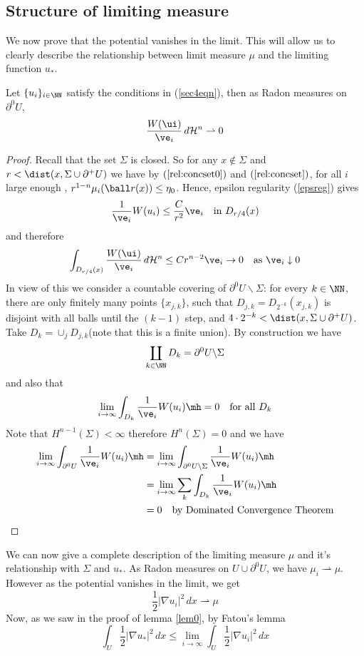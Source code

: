 \subsection{Structure of limiting measure}
We now prove that the potential vanishes in the limit. This will allow us to clearly describe the relationship between limit measure $\mu$ and the limiting function $u_*$.
\begin{prop} \label{vanishing}
Let $\{u_i\}_{i \in \NN}$ satisfy the conditions in (\ref{sec4eqn}), then as Radon measures on $\partial^0 U$,
$$\frac{W(\ui)}{\ve_i}\,d\mathcal{H}^n \rightharpoonup 0 $$
\end{prop}
\begin{proof}
    Recall that the set $\Sigma$ is closed. So for any $x\notin \Sigma$ and $r < \dist(x,\Sigma \cup \partial^+ U)$ we have by $(\ref{rel:concset0})$ and $(\ref{rel:concset})$, for all $i$ large enough , $r^{1-n} \mu_i(\ball r (x) ) \leq \eta_0$. Hence, epsilon regularity (\ref{epsreg}) gives 
$$\frac{1}{\ve_i} W(u_i)  \leq \frac{C}{r^2} \ve_i \quad \text{in } D_{r/4}(x) $$
and therefore
$$\int_{D_{r/4}(x)}\frac{W(\ui)}{\ve_i}\,d\mathcal{H}^n \leq Cr^{n-2}\ve_i \to 0  \quad \text{as }\ve_i \downarrow 0 $$
In view of this we consider a countable covering of $\partial^0U \backslash \Sigma$: for every $k\in \NN$, there are only finitely many points $\{x_{j,k}\}$, such that $D_{j,k}=D_{2^{-k}}(x_{j,k})$ is disjoint with all balls until the $(k-1)$ step, and $4\cdot 2^{-k} < \dist(x,\Sigma \cup \partial^+ U)$. Take $D_k = \cup_{j} D_{j,k}$(note that this is a finite union). By construction we have
$$ \coprod_{k \in \NN} D_k = \partial^0U \backslash \Sigma $$
and also that
$$ \lim_{i \to \infty} \int_{D_k} \frac{1}{\ve_i} W(u_i)  \mh = 0 \quad \text{for all } D_k   $$
Note that $H^{n-1}(\Sigma)< \infty$  therefore $H^n(\Sigma)=0$ and we have
\begin{align*}
    \lim_{i \to \infty} \int_{\partial^0 U} \frac{1}{\ve_i} W(u_i) \mh  &= \lim_{i \to \infty} \int_{\partial^0 U \backslash \Sigma} \frac{1}{\ve_i} W(u_i) \mh  \\
     &= \lim_{i \to \infty} \sum_{k} \int_{D_{k}} \frac{1}{\ve_i} W(u_i)  \mh \\
     &= 0 \quad \text{by Dominated Convergence Theorem}
\end{align*}

\end{proof}


We can now give a complete description of the limiting measure $\mu$ and it's relationship with $\Sigma$ and $u_*$. As Radon measures on $U \cup \partial^0U$, we have $\mu_i \rightharpoonup \mu $. However as the potential vanishes in the limit, we get
$$\frac{1}{2}|\nabla u_i|^2 \,dx \rightharpoonup \mu$$
Now, as we saw in the proof of lemma \ref{lem0}, by Fatou's lemma 
\begin{equation} \label{fatou}
\int_U \frac{1}{2}|\nabla u_*|^2 \,dx \leq \lim_{i \to \infty} \int_U \frac{1}{2}|\nabla u_i|^2 \,dx     
\end{equation}

